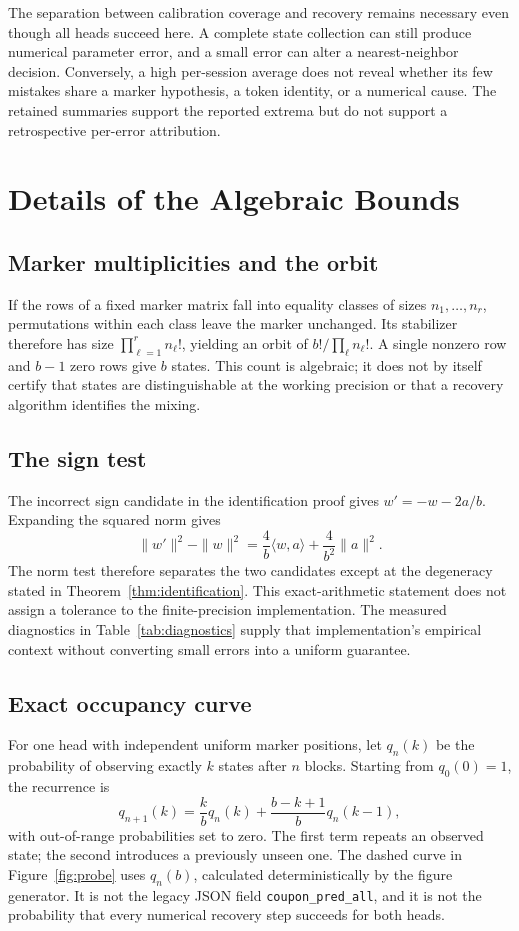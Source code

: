 The separation between calibration coverage and recovery remains necessary even though all heads succeed here. A complete state collection can still produce numerical parameter error, and a small error can alter a nearest-neighbor decision. Conversely, a high per-session average does not reveal whether its few mistakes share a marker hypothesis, a token identity, or a numerical cause. The retained summaries support the reported extrema but do not support a retrospective per-error attribution.

\section{Details of the Algebraic Bounds}
\label{app:bounds}
\subsection{Marker multiplicities and the orbit}
If the rows of a fixed marker matrix fall into equality classes of sizes $n_1,\ldots,n_r$, permutations within each class leave the marker unchanged. Its stabilizer therefore has size $\prod_{\ell=1}^r n_\ell!$, yielding an orbit of $b!/\prod_\ell n_\ell!$. A single nonzero row and $b-1$ zero rows give $b$ states. This count is algebraic; it does not by itself certify that states are distinguishable at the working precision or that a recovery algorithm identifies the mixing.

\subsection{The sign test}
The incorrect sign candidate in the identification proof gives $w'=-w-2a/b$. Expanding the squared norm gives
\begin{equation}
 \|w'\|^2-\|w\|^2
 =\frac{4}{b}\langle w,a\rangle+\frac{4}{b^2}\|a\|^2.
\end{equation}
The norm test therefore separates the two candidates except at the degeneracy stated in Theorem~\ref{thm:identification}. This exact-arithmetic statement does not assign a tolerance to the finite-precision implementation. The measured diagnostics in Table~\ref{tab:diagnostics} supply that implementation's empirical context without converting small errors into a uniform guarantee.

\subsection{Exact occupancy curve}
For one head with independent uniform marker positions, let $q_n(k)$ be the probability of observing exactly $k$ states after $n$ blocks. Starting from $q_0(0)=1$, the recurrence is
\begin{equation}
 q_{n+1}(k)=\frac{k}{b}q_n(k)
            +\frac{b-k+1}{b}q_n(k-1),
\end{equation}
with out-of-range probabilities set to zero. The first term repeats an observed state; the second introduces a previously unseen one. The dashed curve in Figure~\ref{fig:probe} uses $q_n(b)$, calculated deterministically by the figure generator. It is not the legacy JSON field \texttt{coupon\_pred\_all}, and it is not the probability that every numerical recovery step succeeds for both heads.

